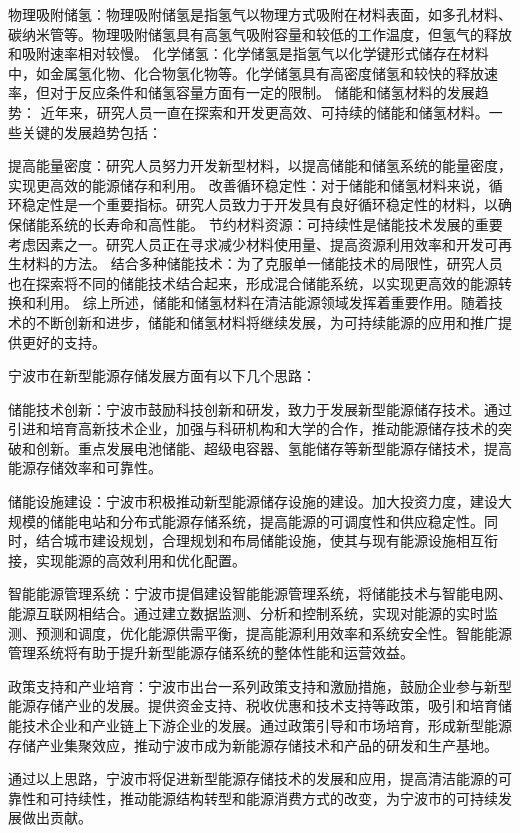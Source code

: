 物理吸附储氢：物理吸附储氢是指氢气以物理方式吸附在材料表面，如多孔材料、碳纳米管等。物理吸附储氢具有高氢气吸附容量和较低的工作温度，但氢气的释放和吸附速率相对较慢。
化学储氢：化学储氢是指氢气以化学键形式储存在材料中，如金属氢化物、化合物氢化物等。化学储氢具有高密度储氢和较快的释放速率，但对于反应条件和储氢容量方面有一定的限制。
储能和储氢材料的发展趋势：
近年来，研究人员一直在探索和开发更高效、可持续的储能和储氢材料。一些关键的发展趋势包括：

提高能量密度：研究人员努力开发新型材料，以提高储能和储氢系统的能量密度，实现更高效的能源储存和利用。
改善循环稳定性：对于储能和储氢材料来说，循环稳定性是一个重要指标。研究人员致力于开发具有良好循环稳定性的材料，以确保储能系统的长寿命和高性能。
节约材料资源：可持续性是储能技术发展的重要考虑因素之一。研究人员正在寻求减少材料使用量、提高资源利用效率和开发可再生材料的方法。
结合多种储能技术：为了克服单一储能技术的局限性，研究人员也在探索将不同的储能技术结合起来，形成混合储能系统，以实现更高效的能源转换和利用。
综上所述，储能和储氢材料在清洁能源领域发挥着重要作用。随着技术的不断创新和进步，储能和储氢材料将继续发展，为可持续能源的应用和推广提供更好的支持。



宁波市在新型能源存储发展方面有以下几个思路：

储能技术创新：宁波市鼓励科技创新和研发，致力于发展新型能源储存技术。通过引进和培育高新技术企业，加强与科研机构和大学的合作，推动能源储存技术的突破和创新。重点发展电池储能、超级电容器、氢能储存等新型能源存储技术，提高能源存储效率和可靠性。

储能设施建设：宁波市积极推动新型能源储存设施的建设。加大投资力度，建设大规模的储能电站和分布式能源存储系统，提高能源的可调度性和供应稳定性。同时，结合城市建设规划，合理规划和布局储能设施，使其与现有能源设施相互衔接，实现能源的高效利用和优化配置。

智能能源管理系统：宁波市提倡建设智能能源管理系统，将储能技术与智能电网、能源互联网相结合。通过建立数据监测、分析和控制系统，实现对能源的实时监测、预测和调度，优化能源供需平衡，提高能源利用效率和系统安全性。智能能源管理系统将有助于提升新型能源存储系统的整体性能和运营效益。

政策支持和产业培育：宁波市出台一系列政策支持和激励措施，鼓励企业参与新型能源存储产业的发展。提供资金支持、税收优惠和技术支持等政策，吸引和培育储能技术企业和产业链上下游企业的发展。通过政策引导和市场培育，形成新型能源存储产业集聚效应，推动宁波市成为新能源存储技术和产品的研发和生产基地。

通过以上思路，宁波市将促进新型能源存储技术的发展和应用，提高清洁能源的可靠性和可持续性，推动能源结构转型和能源消费方式的改变，为宁波市的可持续发展做出贡献。


